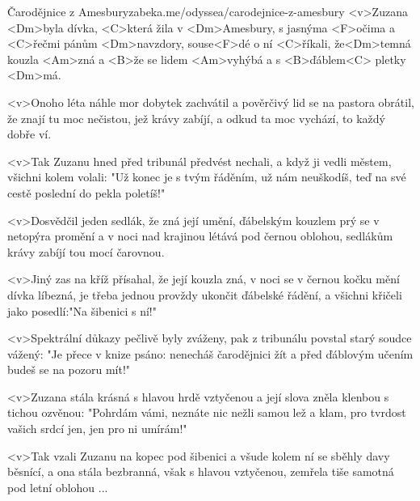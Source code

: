 \begin{song}[Asonance]{2}{Čarodějnice z Amesbury}{zabeka.me/odyssea/carodejnice-z-amesbury}
	<v>Zuzana <Dm>byla dívka, <C>která žila v <Dm>Amesbury,
	s jasnýma <F>očima a <C>řečmi pánům <Dm>navzdory,
	souse<F>dé o ní <C>říkali, že<Dm>temná kouzla <Am>zná
	a <B>že se lidem <Am>vyhýbá a s <B>ďáblem<C> pletky <Dm>má.

	<v>Onoho léta náhle mor dobytek zachvátil
	a pověrčivý lid se na pastora obrátil,
	že znají tu moc nečistou, jež krávy zabíjí,
	a odkud ta moc vychází, to každý dobře ví.

	<v>Tak Zuzanu hned před tribunál předvést nechali,
	a když ji vedli městem, všichni kolem volali:
	"Už konec je s tvým řáděním, už nám neuškodíš,
	teď na své cestě poslední do pekla poletíš!"

	<v>Dosvědčil jeden sedlák, že zná její umění,
	ďábelským kouzlem prý se v netopýra promění
	a v noci nad krajinou létává pod černou oblohou,
	sedlákům krávy zabíjí tou mocí čarovnou.

	<v>Jiný zas na kříž přísahal, že její kouzla zná,
	v noci se v černou kočku mění dívka líbezná,
	je třeba jednou provždy ukončit ďábelské řádění,
	a všichni křičeli jako posedlí:"Na šibenici s ní!"

	<v>Spektrální důkazy pečlivě byly zváženy,
	pak z tribunálu povstal starý soudce vážený:
	"Je přece v knize psáno: nenecháš čarodějnici žít
	a před ďáblovým učením budeš se na pozoru mít!"

	<v>Zuzana stála krásná s hlavou hrdě vztyčenou
	a její slova zněla klenbou s tichou ozvěnou:
	"Pohrdám vámi, neznáte nic nežli samou lež a klam,
	pro tvrdost vašich srdcí jen, jen pro ni umírám!"

	<v>Tak vzali Zuzanu na kopec pod šibenici
	a všude kolem ní se sběhly davy běsnící,
	a ona stála bezbranná, však s hlavou vztyčenou,
	zemřela tiše samotná pod letní oblohou ...
\end{song}
